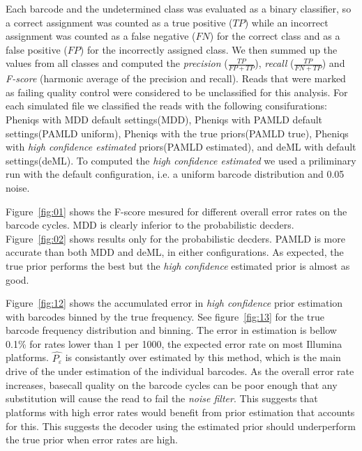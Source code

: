 \documentclass[10pt,twocolumn]{article}
\begin{document}
Each barcode and the undetermined class was evaluated as a binary classifier, so a correct assignment was counted as a true positive ($TP$) while an incorrect assignment was counted as a false negative ($FN$) for the correct class and as a false positive ($FP$) for the incorrectly assigned class. We then summed up the values from all classes and computed the \emph{precision} ($\frac{TP}{FP + TP}$), \emph{recall} ($\frac{TP}{FN + TP}$) and \emph{F-score} (harmonic average of the precision and recall). Reads that were marked as failing quality control were considered to be unclassified for this analysis. For each simulated file we classified the reads with the following consifurations: Pheniqs with MDD default settings(MDD), Pheniqs with PAMLD default settings(PAMLD uniform), Pheniqs with the true priors(PAMLD true), Pheniqs with \emph{high confidence estimated} priors(PAMLD estimated), and deML with default settings(deML). To computed the \emph{high confidence estimated} we used a priliminary run with the default configuration, i.e. a uniform barcode distribution and 0.05 noise.

Figure~\ref{fig:01} shows the F-score mesured for different overall error rates on the barcode cycles. MDD is clearly inferior to the probabilistic decders. Figure~\ref{fig:02} shows results only for the probabilistic decders. PAMLD is more accurate than both MDD and deML, in either configurations. As expected, the true prior performs the best but the \emph{high confidence} estimated prior is almost as good.

Figure~\ref{fig:12} shows the accumulated error in \emph{high confidence} prior estimation with barcodes binned by the true frequency. See figure~\ref{fig:13} for the true barcode frequency distribution and binning. The error in estimation is bellow 0.1\% for rates lower than 1 per 1000, the expected error rate on most Illumina platforms.  $\hat{P_{\varepsilon}}$ is consistantly over estimated by this method, which is the main drive of the under estimation of the individual barcodes. As the overall error rate increases, basecall quality on the barcode cycles can be poor enough that any substitution will cause the read to fail the \emph{noise filter}. This suggests that platforms with high error rates would benefit from prior estimation that accounts for this. This suggests the decoder using the estimated prior should underperform the true prior when error rates are high.
\end{document}
